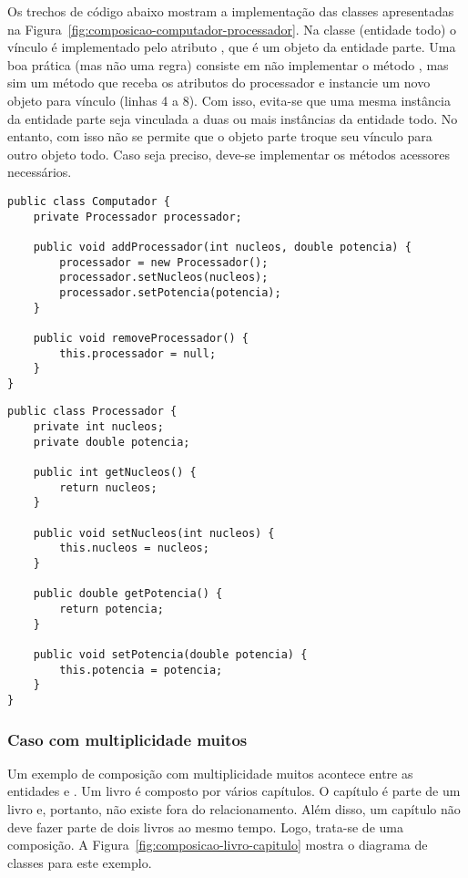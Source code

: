Os trechos de código abaixo mostram a implementação das classes apresentadas na Figura~\ref{fig:composicao-computador-processador}. Na classe  (entidade todo) o vínculo é implementado pelo atributo , que é um objeto da entidade parte. Uma boa prática (mas não uma regra) consiste em não implementar o método , mas sim um método que receba os atributos do processador e instancie um novo objeto para vínculo (linhas 4 a 8). Com isso, evita-se que uma mesma instância da entidade parte seja vinculada a duas ou mais instâncias da entidade todo. No entanto, com isso não se permite que o objeto parte troque seu vínculo para outro objeto todo. Caso seja preciso, deve-se implementar os métodos acessores necessários.

\begin{verbatim}
public class Computador {
	private Processador processador;

	public void addProcessador(int nucleos, double potencia) {
		processador = new Processador();
		processador.setNucleos(nucleos);
		processador.setPotencia(potencia);
	}
	
	public void removeProcessador() {
		this.processador = null;
	}
}
\end{verbatim}
 
\begin{verbatim}
public class Processador {
	private int nucleos;
	private double potencia;
	
	public int getNucleos() {
		return nucleos;
	}

	public void setNucleos(int nucleos) {
		this.nucleos = nucleos;
	}

	public double getPotencia() {
		return potencia;
	}
	
	public void setPotencia(double potencia) {
		this.potencia = potencia;
	}
}
\end{verbatim}

\subsubsection{Caso com multiplicidade muitos}

Um exemplo de composição com multiplicidade muitos acontece entre as entidades  e . Um livro é composto por vários capítulos. O capítulo é parte de um livro e, portanto, não existe fora do relacionamento. Além disso, um capítulo não deve fazer parte de dois livros ao mesmo tempo. Logo, trata-se de uma composição. A Figura~\ref{fig:composicao-livro-capitulo} mostra o diagrama de classes para este exemplo.

